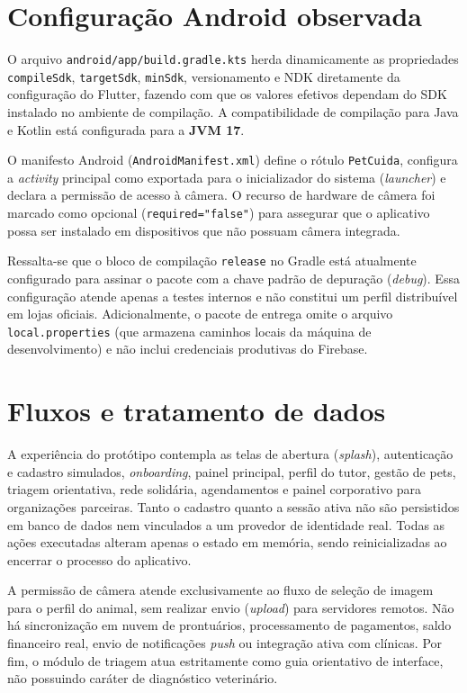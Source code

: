 \documentclass[12pt,a4paper]{article}
\begin{document}
\section{Configuração Android observada}
O arquivo \texttt{android/app/build.gradle.kts} herda dinamicamente as propriedades \texttt{compileSdk}, \texttt{targetSdk}, \texttt{minSdk}, versionamento e NDK diretamente da configuração do Flutter, fazendo com que os valores efetivos dependam do SDK instalado no ambiente de compilação. A compatibilidade de compilação para Java e Kotlin está configurada para a \textbf{JVM 17}.

O manifesto Android (\texttt{AndroidManifest.xml}) define o rótulo \texttt{PetCuida}, configura a \textit{activity} principal como exportada para o inicializador do sistema (\textit{launcher}) e declara a permissão de acesso à câmera. O recurso de hardware de câmera foi marcado como opcional (\texttt{required="false"}) para assegurar que o aplicativo possa ser instalado em dispositivos que não possuam câmera integrada.

Ressalta-se que o bloco de compilação \texttt{release} no Gradle está atualmente configurado para assinar o pacote com a chave padrão de depuração (\textit{debug}). Essa configuração atende apenas a testes internos e não constitui um perfil distribuível em lojas oficiais. Adicionalmente, o pacote de entrega omite o arquivo \texttt{local.properties} (que armazena caminhos locais da máquina de desenvolvimento) e não inclui credenciais produtivas do Firebase.

\section{Fluxos e tratamento de dados}
A experiência do protótipo contempla as telas de abertura (\textit{splash}), autenticação e cadastro simulados, \textit{onboarding}, painel principal, perfil do tutor, gestão de pets, triagem orientativa, rede solidária, agendamentos e painel corporativo para organizações parceiras. Tanto o cadastro quanto a sessão ativa não são persistidos em banco de dados nem vinculados a um provedor de identidade real. Todas as ações executadas alteram apenas o estado em memória, sendo reinicializadas ao encerrar o processo do aplicativo.

A permissão de câmera atende exclusivamente ao fluxo de seleção de imagem para o perfil do animal, sem realizar envio (\textit{upload}) para servidores remotos. Não há sincronização em nuvem de prontuários, processamento de pagamentos, saldo financeiro real, envio de notificações \textit{push} ou integração ativa com clínicas. Por fim, o módulo de triagem atua estritamente como guia orientativo de interface, não possuindo caráter de diagnóstico veterinário.
\end{document}

